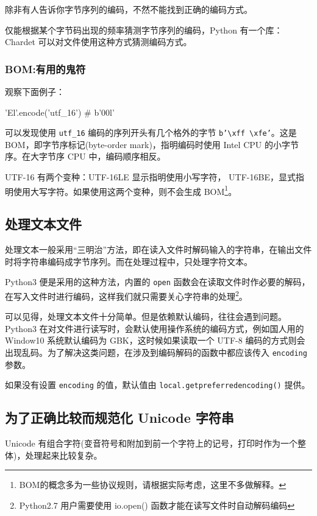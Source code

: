 除非有人告诉你字节序列的编码，不然不能找到正确的编码方式。

仅能根据某个字节码出现的频率猜测字节序列的编码，Python 有一个库：Chardet 可以对文件使用这种方式猜测编码方式。

\subsubsection{BOM:有用的鬼符}

观察下面例子：
\begin{python}
'El'.encode('utf_16')   # b'\xff\xfeE\x00l'
\end{python}

可以发现使用 \texttt{utf\_16} 编码的序列开头有几个格外的字节 \texttt{b'\textbackslash xff \textbackslash xfe'}。这是 BOM，即字节序标记(byte-order mark)，指明编码时使用 Intel CPU 的小字节序。在大字节序 CPU 中，编码顺序相反。

UTF-16 有两个变种：UTF-16LE 显示指明使用小写字符， UTF-16BE，显式指明使用大写字符。如果使用这两个变种，则不会生成 BOM\footnote{BOM的概念多为一些协议规则，请根据实际考虑，这里不多做解释。}。

\subsection{处理文本文件}

处理文本一般采用``三明治''方法，即在读入文件时解码输入的字符串，在输出文件时将字符串编码成字节序列。而在处理过程中，只处理字符文本。

Python3 便是采用的这种方法，内置的 \texttt{open} 函数会在读取文件时作必要的解码，在写入文件时进行编码，这样我们就只需要关心字符串的处理\footnote{Python2.7 用户需要使用 io.open() 函数才能在读写文件时自动解码编码}。

可以见得，处理文本文件十分简单。但是依赖默认编码，往往会遇到问题。Python3 在对文件进行读写时，会默认使用操作系统的编码方式，例如国人用的 Window10 系统默认编码为 GBK，这时候如果读取一个 UTF-8 编码的方式则会出现乱码。为了解决这类问题，在涉及到编码解码的函数中都应该传入 \texttt{encoding} 参数。

如果没有设置 \texttt{encoding} 的值，默认值由 \texttt{local.getpreferredencoding()} 提供。

\subsection{为了正确比较而规范化 Unicode 字符串}

Unicode 有组合字符(变音符号和附加到前一个字符上的记号，打印时作为一个整体)，处理起来比较复杂。

